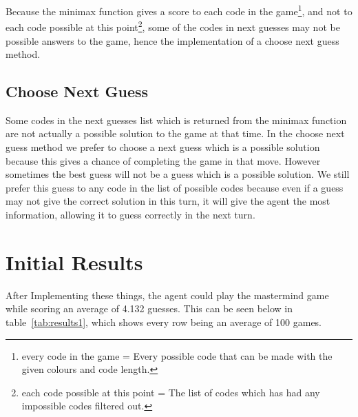 \documentclass[12pt]{article}
\begin{document}

Because the minimax function gives a score to each code in the game\footnote{every code in the game = Every possible code that can be made with the given colours and code length.}, and not to each code possible at this point\footnote{each code possible at this point = The list of codes which has had any impossible codes filtered out.}, some of the codes in next guesses may not be possible answers to the game, hence the implementation of a choose next guess method.

\subsection{Choose Next Guess}
Some codes in the next guesses list which is returned from the minimax function are not actually a possible solution to the game at that time. In the choose next guess method we prefer to choose a next guess which is a possible solution because this gives a chance of completing the game in that move. However sometimes the best guess will not be a guess which is a possible solution. We still prefer this guess to any code in the list of possible codes because even if a guess may not give the correct solution in this turn, it will give the agent the most information, allowing it to guess correctly in the next turn. 

\section{Initial Results}
After Implementing these things, the agent could play the mastermind game while scoring an average of 4.132 guesses. This can be seen below in table~\ref{tab:results1}, which shows every row being an average of 100 games.
\end{document}
